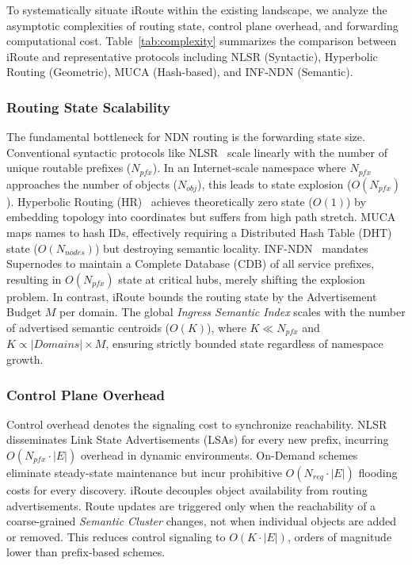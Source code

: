 \documentclass[conference]{IEEEtran}
\newcommand{\sysname}{iRoute}
\begin{document}
To systematically situate \sysname{} within the existing landscape, we analyze the asymptotic complexities of routing state, control plane overhead, and forwarding computational cost. Table~\ref{tab:complexity} summarizes the comparison between \sysname{} and representative protocols including NLSR (Syntactic), Hyperbolic Routing (Geometric), MUCA (Hash-based), and INF-NDN (Semantic).

\subsubsection{Routing State Scalability}
The fundamental bottleneck for NDN routing is the forwarding state size.
Conventional syntactic protocols like NLSR~\cite{nlsr} scale linearly with the number of unique routable prefixes ($N_{pfx}$). In an Internet-scale namespace where $N_{pfx}$ approaches the number of objects ($N_{obj}$), this leads to state explosion ($O(N_{pfx})$).
Hyperbolic Routing (HR)~\cite{hyperbolic} achieves theoretically zero state ($O(1)$) by embedding topology into coordinates but suffers from high path stretch.
MUCA~\cite{muca} maps names to hash IDs, effectively requiring a Distributed Hash Table (DHT) state ($O(N_{nodes})$) but destroying semantic locality.
INF-NDN~\cite{inf_ndn_iot} mandates Supernodes to maintain a Complete Database (CDB) of all service prefixes, resulting in $O(N_{pfx})$ state at critical hubs, merely shifting the explosion problem.
In contrast, \sysname{} bounds the routing state by the Advertisement Budget $M$ per domain. The global \emph{Ingress Semantic Index} scales with the number of advertised semantic centroids ($O(K)$), where $K \ll N_{pfx}$ and $K \propto |Domains| \times M$, ensuring strictly bounded state regardless of namespace growth.

\subsubsection{Control Plane Overhead}
Control overhead denotes the signaling cost to synchronize reachability.
NLSR disseminates Link State Advertisements (LSAs) for every new prefix, incurring $O(N_{pfx} \cdot |E|)$ overhead in dynamic environments.
On-Demand schemes~\cite{ondemand} eliminate steady-state maintenance but incur prohibitive $O(N_{req} \cdot |E|)$ flooding costs for every discovery.
\sysname{} decouples object availability from routing advertisements. Route updates are triggered only when the reachability of a coarse-grained \emph{Semantic Cluster} changes, not when individual objects are added or removed. This reduces control signaling to $O(K \cdot |E|)$, orders of magnitude lower than prefix-based schemes.
\end{document}
